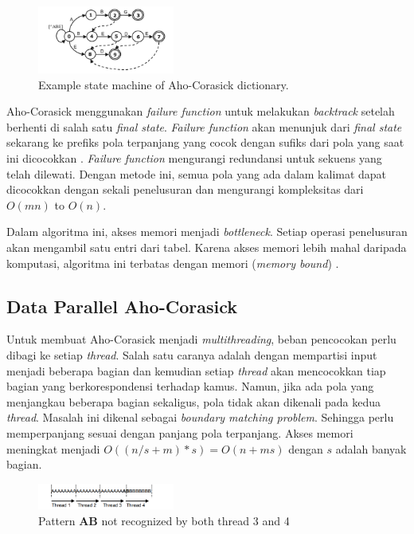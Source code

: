 \documentclass[conference]{IEEEtran}
\begin{document}
    \begin{figure}[htbp]
        \centerline{\includegraphics[width=0.4\textwidth]{../src/resources/aho-c.png}}
        \caption{Example state machine of Aho-Corasick dictionary.}
    \end{figure}

    Aho-Corasick menggunakan \emph{failure function} untuk melakukan \emph{backtrack} setelah berhenti di salah satu \emph{final state}. \emph{Failure function} akan menunjuk dari \emph{final state} sekarang ke prefiks pola terpanjang yang cocok dengan sufiks dari pola yang saat ini dicocokkan \cite{ahoc1975}. \emph{Failure function} mengurangi redundansi untuk sekuens yang telah dilewati. Dengan metode ini, semua pola yang ada dalam kalimat dapat dicocokkan dengan sekali penelusuran dan mengurangi kompleksitas dari $O(mn)$ to $O(n)$. 

    Dalam algoritma ini, akses memori menjadi \emph{bottleneck}. Setiap operasi penelusuran akan mengambil satu entri dari tabel. Karena akses memori lebih mahal daripada komputasi, algoritma ini terbatas dengan memori (\emph{memory bound}) \cite{lin2013}.

    \subsection{Data Parallel Aho-Corasick}
    Untuk membuat Aho-Corasick menjadi \emph{multithreading}, beban pencocokan perlu dibagi ke setiap \emph{thread}. Salah satu caranya adalah dengan mempartisi input menjadi beberapa bagian dan kemudian setiap \emph{thread} akan mencocokkan tiap bagian yang berkorespondensi terhadap kamus. Namun, jika ada pola yang menjangkau beberapa bagian sekaligus, pola tidak akan dikenali pada kedua \emph{thread}. Masalah ini dikenal sebagai \emph{boundary matching problem}. Sehingga perlu memperpanjang sesuai dengan panjang pola terpanjang. Akses memori meningkat menjadi $O((n/s + m) * s) = O(n + ms)$ dengan $s$ adalah banyak bagian. 

    \begin{figure}[htbp]
        \centerline{\includegraphics[width=0.4\textwidth]{../src/resources/boundary.png}}
        \caption{Pattern \textbf{AB} not recognized by both thread 3 and 4}
    \end{figure}
\end{document}
